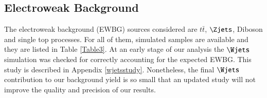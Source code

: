 \subsection{Electroweak Background}
The electroweak background (EWBG) sources considered are $t\bar{t}$, $\Zjets$, Diboson and single top processes. For all of them, simulated samples are available and they are listed in Table \ref{Table3}. At an early stage of our analysis the $\Wjets$  simulation was checked for correctly accounting for the expected EWBG. This study is described in Appendix \ref{wjetsstudy}. Nonetheless, the final $\Wjets$ contribution to our background yield is so small that an updated study will not improve the quality and precision of our results.  